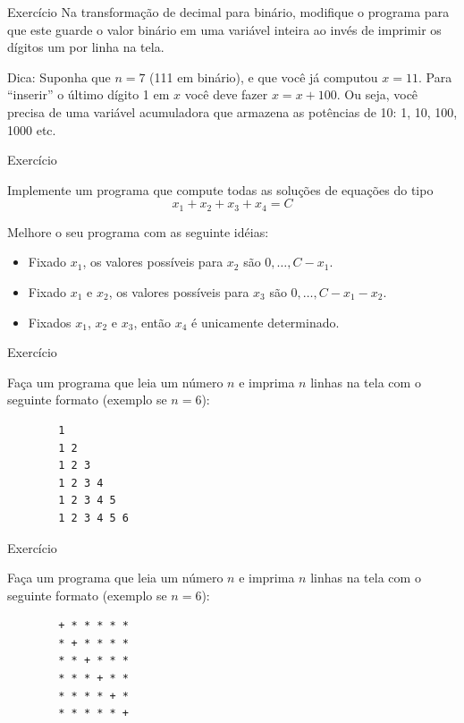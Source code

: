 \documentclass[handout]{beamer}
\begin{document}
\begin{frame}[fragile]{Exercício}
    Na transformação de decimal para binário, modifique o programa para que este guarde o valor binário em uma variável inteira ao invés de imprimir os dígitos um por linha na tela.

    Dica: Suponha que $n=7$ (111 em binário), e que você já computou $x=11$. Para ``inserir'' o último dígito 1 em $x$ você deve fazer $x = x + 100$. Ou seja, você precisa de uma variável acumuladora que armazena as potências de 10: 1, 10, 100, 1000 etc.
\end{frame}

\begin{frame}[fragile]{Exercício}
    
    Implemente um programa que compute todas as soluções de equações do tipo 
    $$ x_1 + x_2 + x_3  + x_4 = C $$

    Melhore o seu programa com as seguinte idéias:
    \begin{itemize}
        \item Fixado $x_1$, os valores possíveis para $x_2$ são $0,\dots, C-x_1$.
        \item Fixado $x_1$ e $x_2$, os valores possíveis para $x_3$ são $0, \ldots, C-x_1-x_2$.
        \item Fixados $x_1$, $x_2$ e $x_3$, então $x_4$ é unicamente determinado.
    \end{itemize}
\end{frame}

\begin{frame}[fragile]{Exercício}
    
    Faça um programa que leia um número $n$ e imprima $n$ linhas na tela com o seguinte formato (exemplo se $n=6$):

    \begin{verbatim}
        1
        1 2
        1 2 3
        1 2 3 4
        1 2 3 4 5
        1 2 3 4 5 6
    \end{verbatim}
\end{frame}

\begin{frame}[fragile]{Exercício}
    
    Faça um programa que leia um número $n$ e imprima $n$ linhas na tela com o seguinte formato (exemplo se $n=6$):

    \begin{verbatim}
        + * * * * *
        * + * * * *
        * * + * * *
        * * * + * *
        * * * * + *
        * * * * * +
    \end{verbatim}
\end{frame}
\end{document}
